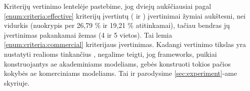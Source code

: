 \begin{criteriaTable}
\end{criteriaTable}

Kriterijų vertinimo lentelėje pastebime, jog dviejų aukščiausiai pagal \ref{enum:criteria:effective} kriterijų įvertintų  ( ir ) įvertinimai žymiai aukštesni, nei vidurkis (nuokrypis per 26,79 \% ir 19,21 \% atitinkamai), tačiau bendras jų įvertinimas pakankamai žemas (4 ir 5 vietos). Tai lemia \ref{enum:criteria:commercial} kriterijaus įvertinimas. Kadangi vertinimo tikslas yra nustatyti realioms  tinkančius , negalime teigti, jog \glspl{framework}, puikiai konstruojantys \acs{ae} akademiniams modeliams, gebės konstruoti tokios pačios kokybės \acs{ae} komerciniams modeliams. Tai ir parodysime \ref{sec:experiment}-ame skyriuje. 